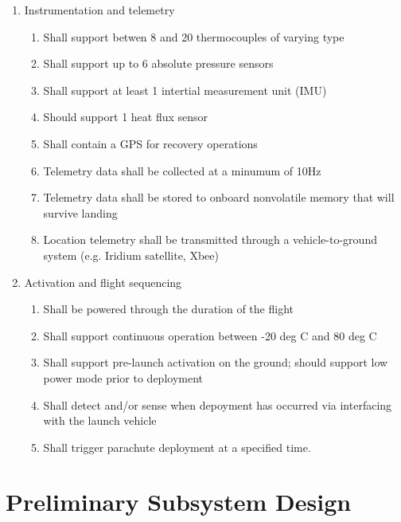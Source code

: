 \documentclass{article}
\begin{document}
\begin{enumerate}
\item Instrumentation and telemetry
  \begin{enumerate}
  \item Shall support betwen 8 and 20 thermocouples of varying type
  \item Shall support up to 6 absolute pressure sensors
  \item Shall support at least 1 intertial measurement unit (IMU)
  \item Should support 1 heat flux sensor
  \item Shall contain a GPS for recovery operations
  \item Telemetry data shall be collected at a minumum of 10Hz
  \item Telemetry data shall be stored to onboard nonvolatile memory that will survive landing
  \item Location telemetry shall be transmitted through a vehicle-to-ground system (e.g. Iridium satellite, Xbee)
  \end{enumerate}
\item Activation and flight sequencing
  \begin{enumerate}
  \item Shall be powered through the duration of the flight
  \item Shall support continuous operation between -20 deg C and 80 deg C
  \item Shall support pre-launch activation on the ground; should support low power mode prior to deployment
  \item Shall detect and/or sense when depoyment has occurred via interfacing with the launch vehicle
  \item Shall trigger parachute deployment at a specified time.
  \end{enumerate}
\end{enumerate}




\section{Preliminary Subsystem Design}
\label{sec:ss-design}
\end{document}
